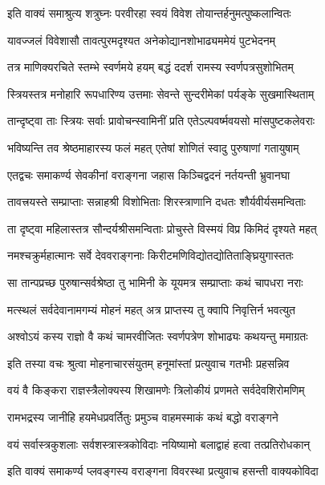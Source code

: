 
\twolineshloka
{इति वाक्यं समाश्रुत्य शत्रुघ्नः परवीरहा}
{स्वयं विवेश तोयान्तर्हनुमत्पुष्कलान्वितः}%

\twolineshloka
{यावज्जलं विवेशासौ तावत्पुरमदृश्यत}
{अनेकोद्यानशोभाढ्यममेयं पुटभेदनम्}%

\twolineshloka
{तत्र माणिक्यरचिते स्तम्भे स्वर्णमये हयम्}
{बद्धं ददर्श रामस्य स्वर्णपत्रसुशोभितम्}%

\twolineshloka
{स्त्रियस्तत्र मनोहारि रूपधारिण्य उत्तमाः}
{सेवन्ते सुन्दरीमेकां पर्यङ्के सुखमास्थिताम्}%

\twolineshloka
{तान्दृष्ट्वा ताः स्त्रियः सर्वाः प्रावोचन्स्वामिनीं प्रति}
{एतेऽल्पवर्ष्मवयसो मांसपुष्टकलेवराः}%

\twolineshloka
{भविष्यन्ति तव श्रेष्ठमाहारस्य फलं महत्}
{एतेषां शोणितं स्वादु पुरुषाणां गतायुषाम्}%

\twolineshloka
{एतद्वचः समाकर्ण्य सेवकीनां वराङ्गना}
{जहास किञ्चिद्वदनं नर्तयन्ती भ्रुवानघा}%

\twolineshloka
{तावत्त्रयस्ते सम्प्राप्ताः सन्नाहश्री विशोभिताः}
{शिरस्त्राणानि दधतः शौर्यवीर्यसमन्विताः}%

\twolineshloka
{ता दृष्ट्वा महिलास्तत्र सौन्दर्यश्रीसमन्विताः}
{प्रोचुस्ते विस्मयं विप्र किमिदं दृश्यते महत्}%

\twolineshloka
{नमश्चक्रुर्महात्मानः सर्वे देववराङ्गनाः}
{किरीटमणिविद्योतद्योतिताङ्घ्रियुगास्ततः}%

\twolineshloka
{सा तान्पप्रच्छ पुरुषान्सर्वश्रेष्ठा तु भामिनी}
{के यूयमत्र सम्प्राप्ताः कथं चापधरा नराः}%

\twolineshloka
{मत्स्थलं सर्वदेवानामगम्यं मोहनं महत्}
{अत्र प्राप्तस्य तु क्वापि निवृत्तिर्न भवत्युत}%

\twolineshloka
{अश्वोऽयं कस्य राज्ञो वै कथं चामरवीजितः}
{स्वर्णपत्रेण शोभाढ्यः कथयन्तु ममाग्रतः}%


\twolineshloka
{इति तस्या वचः श्रुत्वा मोहनाचारसंयुतम्}
{हनूमांस्तां प्रत्युवाच गतभीः प्रहसन्निव}%

\twolineshloka
{वयं वै किङ्करा राज्ञस्त्रैलोक्यस्य शिखामणेः}
{त्रिलोकीयं प्रणमते सर्वदेवशिरोमणिम्}%

\twolineshloka
{रामभद्रस्य जानीहि हयमेधप्रवर्तितुः}
{प्रमुञ्च वाहमस्माकं कथं बद्धो वराङ्गने}%

\twolineshloka
{वयं सर्वास्त्रकुशलाः सर्वशस्त्रास्त्रकोविदाः}
{नयिष्यामो बलाद्वाहं हत्वा तत्प्रतिरोधकान्}%

\twolineshloka
{इति वाक्यं समाकर्ण्य प्लवङ्गस्य वराङ्गना}
{विवरस्था प्रत्युवाच हसन्ती वाक्यकोविदा}%

